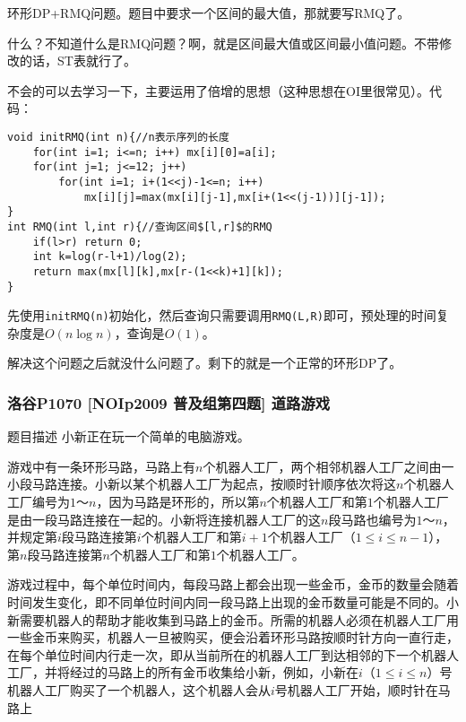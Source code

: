 \documentclass[UTF-8,aspectratio=1610]{ctexbeamer}
\begin{document}
\begin{frame}[fragile]
环形DP+RMQ问题。题目中要求一个区间的最大值，那就要写RMQ了。\pause

什么？不知道什么是RMQ问题？啊，就是区间最大值或区间最小值问题。不带修改的话，ST表就行了。\pause

不会的可以去学习一下，主要运用了倍增的思想（这种思想在OI里很常见）。代码：\pause
\begin{verbatim}
void initRMQ(int n){//n表示序列的长度
    for(int i=1; i<=n; i++) mx[i][0]=a[i];
    for(int j=1; j<=12; j++)
        for(int i=1; i+(1<<j)-1<=n; i++)
            mx[i][j]=max(mx[i][j-1],mx[i+(1<<(j-1))][j-1]);
}
int RMQ(int l,int r){//查询区间$[l,r]$的RMQ 
    if(l>r) return 0;
    int k=log(r-l+1)/log(2);
    return max(mx[l][k],mx[r-(1<<k)+1][k]);
}
\end{verbatim}
\pause

先使用\verb+initRMQ(n)+初始化，然后查询只需要调用\verb+RMQ(L,R)+即可，预处理的时间复杂度是$O(n\log n)$，查询是$O(1)$。

解决这个问题之后就没什么问题了。剩下的就是一个正常的环形DP了。
\end{frame}
\begin{frame}
\frametitle{洛谷P1070 [NOIp2009 普及组第四题] 道路游戏}
\begin{block}{题目描述}
小新正在玩一个简单的电脑游戏。

游戏中有一条环形马路，马路上有$n$个机器人工厂，两个相邻机器人工厂之间由一小段马路连接。小新以某个机器人工厂为起点，按顺时针顺序依次将这$n$个机器人工厂编号为$1$～$n$，因为马路是环形的，所以第$n$个机器人工厂和第$1$个机器人工厂是由一段马路连接在一起的。小新将连接机器人工厂的这$n$段马路也编号为$1$～$n$，并规定第$i$段马路连接第$i$个机器人工厂和第$i+1$个机器人工厂（$1\leqslant i\leqslant n-1$），第$n$段马路连接第$n$个机器人工厂和第$1$个机器人工厂。

游戏过程中，每个单位时间内，每段马路上都会出现一些金币，金币的数量会随着时间发生变化，即不同单位时间内同一段马路上出现的金币数量可能是不同的。小新需要机器人的帮助才能收集到马路上的金币。所需的机器人必须在机器人工厂用一些金币来购买，机器人一旦被购买，便会沿着环形马路按顺时针方向一直行走，在每个单位时间内行走一次，即从当前所在的机器人工厂到达相邻的下一个机器人工厂，并将经过的马路上的所有金币收集给小新，例如，小新在$i$（$1\leqslant i\leqslant n$）号机器人工厂购买了一个机器人，这个机器人会从$i$号机器人工厂开始，顺时针在马路上
\end{block}
\end{frame}
\end{document}
